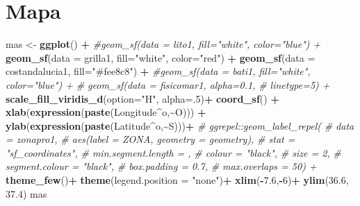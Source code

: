 \documentclass[
]{article}
\newenvironment{Shaded}{\begin{snugshade}}{\end{snugshade}}
\newcommand{\AttributeTok}[1]{\textcolor[rgb]{0.13,0.29,0.53}{#1}}
\newcommand{\CommentTok}[1]{\textcolor[rgb]{0.56,0.35,0.01}{\textit{#1}}}
\newcommand{\DecValTok}[1]{\textcolor[rgb]{0.00,0.00,0.81}{#1}}
\newcommand{\FloatTok}[1]{\textcolor[rgb]{0.00,0.00,0.81}{#1}}
\newcommand{\FunctionTok}[1]{\textcolor[rgb]{0.13,0.29,0.53}{\textbf{#1}}}
\newcommand{\NormalTok}[1]{#1}
\newcommand{\OtherTok}[1]{\textcolor[rgb]{0.56,0.35,0.01}{#1}}
\newcommand{\SpecialCharTok}[1]{\textcolor[rgb]{0.81,0.36,0.00}{\textbf{#1}}}
\newcommand{\StringTok}[1]{\textcolor[rgb]{0.31,0.60,0.02}{#1}}
\begin{document}
\hypertarget{mapa}{%
\section{Mapa}\label{mapa}}

\begin{Shaded}
\begin{Highlighting}[]
\NormalTok{mas }\OtherTok{\textless{}{-}} \FunctionTok{ggplot}\NormalTok{() }\SpecialCharTok{+}
  \CommentTok{\#geom\_sf(data = lito1, fill="white", color="blue") +}
  \FunctionTok{geom\_sf}\NormalTok{(}\AttributeTok{data =}\NormalTok{ grilla1, }\AttributeTok{fill=}\StringTok{"white"}\NormalTok{, }\AttributeTok{color=}\StringTok{"red"}\NormalTok{) }\SpecialCharTok{+}
  \FunctionTok{geom\_sf}\NormalTok{(}\AttributeTok{data =}\NormalTok{ costandalucia1, }\AttributeTok{fill=}\StringTok{"\#fee8c8"}\NormalTok{) }\SpecialCharTok{+}
  \CommentTok{\#geom\_sf(data = bati1, fill="white", color="blue") +}
  \CommentTok{\# geom\_sf(data = fisicomar1, alpha=0.1,}
  \CommentTok{\#         linetype=5) +}
  \FunctionTok{scale\_fill\_viridis\_d}\NormalTok{(}\AttributeTok{option=}\StringTok{"H"}\NormalTok{,}
                       \AttributeTok{alpha=}\NormalTok{.}\DecValTok{5}\NormalTok{)}\SpecialCharTok{+}
  \FunctionTok{coord\_sf}\NormalTok{() }\SpecialCharTok{+}
  \FunctionTok{xlab}\NormalTok{(}\FunctionTok{expression}\NormalTok{(}\FunctionTok{paste}\NormalTok{(Longitude}\SpecialCharTok{\^{}}\NormalTok{o,}\SpecialCharTok{\textasciitilde{}}\StringTok{\textquotesingle{}O\textquotesingle{}}\NormalTok{))) }\SpecialCharTok{+}
  \FunctionTok{ylab}\NormalTok{(}\FunctionTok{expression}\NormalTok{(}\FunctionTok{paste}\NormalTok{(Latitude}\SpecialCharTok{\^{}}\NormalTok{o,}\SpecialCharTok{\textasciitilde{}}\StringTok{\textquotesingle{}S\textquotesingle{}}\NormalTok{)))}\SpecialCharTok{+}
  \CommentTok{\# ggrepel::geom\_label\_repel(}
  \CommentTok{\#   data = zonapro1,}
  \CommentTok{\#   aes(label = ZONA, geometry = geometry),}
  \CommentTok{\#   stat = "sf\_coordinates",}
  \CommentTok{\#   min.segment.length = ,}
  \CommentTok{\#   colour = "black",}
  \CommentTok{\#   size = 2,}
  \CommentTok{\#   segment.colour = "black",}
  \CommentTok{\#   box.padding = 0.7,}
  \CommentTok{\#   max.overlaps = 50) +}
  \FunctionTok{theme\_few}\NormalTok{()}\SpecialCharTok{+}
  \FunctionTok{theme}\NormalTok{(}\AttributeTok{legend.position =} \StringTok{"none"}\NormalTok{)}\SpecialCharTok{+}
  \FunctionTok{xlim}\NormalTok{(}\SpecialCharTok{{-}}\FloatTok{7.6}\NormalTok{,}\SpecialCharTok{{-}}\DecValTok{6}\NormalTok{)}\SpecialCharTok{+}
  \FunctionTok{ylim}\NormalTok{(}\FloatTok{36.6}\NormalTok{, }\FloatTok{37.4}\NormalTok{)}
\NormalTok{mas}
\end{Highlighting}
\end{Shaded}
\end{document}
